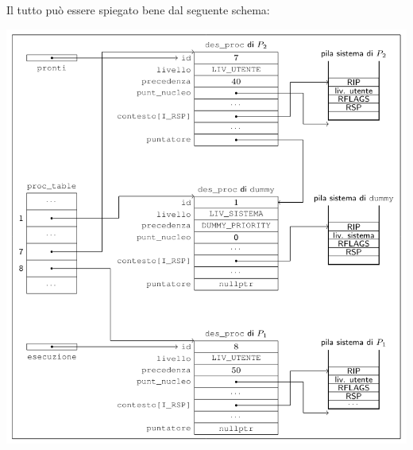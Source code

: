 \documentclass[a4paper,11pt]{article}
\begin{document}
\noindent
\begin{minipage}{\textwidth}
Il tutto può essere spiegato bene dal seguente schema:
\begin{center}
	\includegraphics[scale=0.7]{../figures/des_proc_struct.png}
\end{center}
\end{minipage}

\par\bigskip
\end{document}
